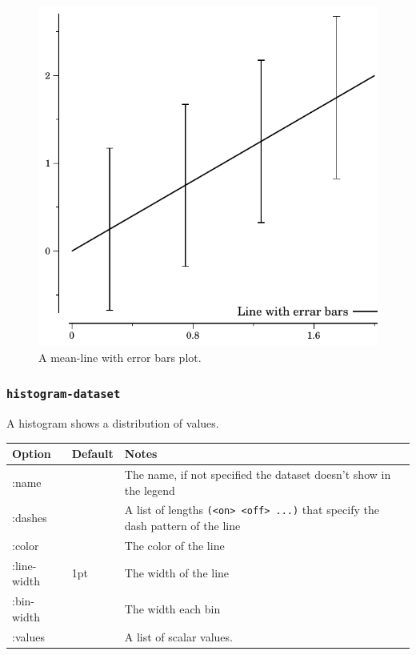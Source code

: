 \documentclass{article}
\begin{document}
\begin{figure}[t]
\begin{center}
\includegraphics{line_err}
\caption{\label{fig:line_err}A mean-line with error bars plot.}
\end{center}
\end{figure}

\subsubsection{\tt histogram-dataset}

A histogram shows a distribution of values.

\begin{center}
\begin{tabular}{lll}
Option & Default & Notes \\
\hline
:name & & The name, if not specified the dataset doesn't show in
the legend\\
:dashes & & A list of lengths {\tt (<on> <off> ...)} that specify the
dash pattern of the line\\
:color & & The color of the line\\
:line-width & 1pt & The width of the line\\
:bin-width &  & The width each bin\\
:values & & A list of scalar values.\\
\end{tabular}
\end{center}
\end{document}
